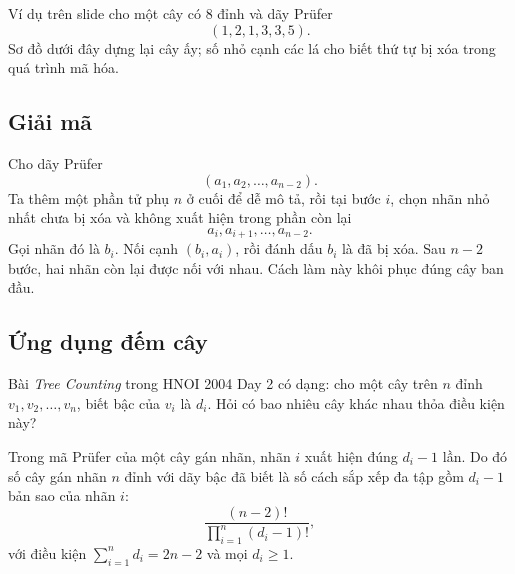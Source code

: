 \documentclass[11pt]{article}
\begin{document}
Ví dụ trên slide cho một cây có \(8\) đỉnh và dãy Prüfer
\[
  (1,2,1,3,3,5).
\]
Sơ đồ dưới đây dựng lại cây ấy; số nhỏ cạnh các lá cho biết thứ tự bị xóa
trong quá trình mã hóa.

\begin{center}
\end{center}

\subsection{Giải mã}

Cho dãy Prüfer
\[
  (a_1,a_2,\ldots,a_{n-2}).
\]
Ta thêm một phần tử phụ \(n\) ở cuối để dễ mô tả, rồi tại bước \(i\), chọn
nhãn nhỏ nhất chưa bị xóa và không xuất hiện trong phần còn lại
\[
  a_i,a_{i+1},\ldots,a_{n-2}.
\]
Gọi nhãn đó là \(b_i\). Nối cạnh \((b_i,a_i)\), rồi đánh dấu \(b_i\) là đã
bị xóa. Sau \(n-2\) bước, hai nhãn còn lại được nối với nhau. Cách làm này
khôi phục đúng cây ban đầu.

\subsection{Ứng dụng đếm cây}

Bài \emph{Tree Counting} trong HNOI 2004 Day 2 có dạng: cho một cây trên
\(n\) đỉnh \(v_1,v_2,\ldots,v_n\), biết bậc của \(v_i\) là \(d_i\). Hỏi có
bao nhiêu cây khác nhau thỏa điều kiện này?

Trong mã Prüfer của một cây gán nhãn, nhãn \(i\) xuất hiện đúng
\(d_i-1\) lần. Do đó số cây gán nhãn \(n\) đỉnh với dãy bậc đã biết là số
cách sắp xếp đa tập gồm \(d_i-1\) bản sao của nhãn \(i\):
\[
  \frac{(n-2)!}{\prod_{i=1}^{n}(d_i-1)!},
\]
với điều kiện \(\sum_{i=1}^{n} d_i = 2n-2\) và mọi \(d_i\ge 1\).
\end{document}
